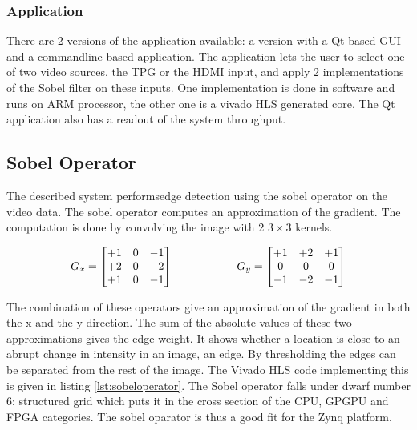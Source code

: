 \subsubsection{Application}
There are 2 versions of the application available: a version with a Qt based GUI and a commandline based application. The application lets the user to select one of two video sources, the TPG or the HDMI input, and apply 2 implementations of the Sobel filter on these inputs. One implementation is done in software and runs on ARM processor, the other one is a vivado HLS generated core. The Qt application also has a readout of the system throughput.


\subsection{Sobel Operator}

The described system performsedge detection using the sobel operator on the video data. The sobel operator computes an approximation of the gradient. The computation is done by convolving the image with 2 $3 \times 3$ kernels.

\begin{equation}
G_{x} = 
\begin{bmatrix}
+1 & 0 & -1 \\
+2 & 0 & -2 \\
+1 & 0 & -1
\end{bmatrix}
\hspace{20mm}
G_{y} = 
\begin{bmatrix}
+1 & +2 & +1 \\
0 & 0 & 0 \\
-1 & -2 & -1 \\
\end{bmatrix}
\end{equation}

The combination of these operators give an approximation of the gradient in both the x and the y direction. The sum of the absolute values of these two approximations gives the edge weight. It shows whether a location is close to an abrupt change in intensity in an image, an edge. By thresholding the edges can be separated from the rest of the image. The Vivado HLS code implementing this is given in listing \ref{lst:sobeloperator}. The Sobel operator falls under dwarf number 6: structured grid which puts it in the cross section of the CPU, GPGPU and FPGA categories. The sobel oparator is thus a good fit for the Zynq platform.

